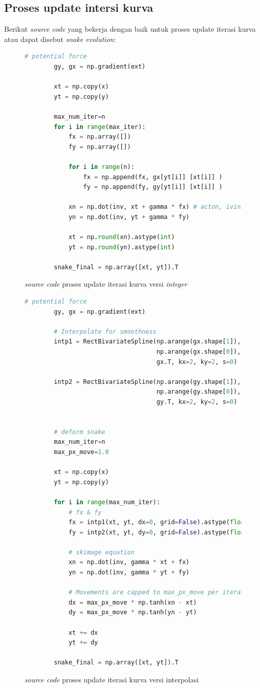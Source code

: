 \subsection{Proses update intersi kurva}
Berikut \emph{source code} yang bekerja dengan baik untuk proses update iterasi kurva atau dapat disebut \emph{snake evolution}:
\begin{figure}[H]
	\begin{lstlisting}[language=Python, basicstyle=\tiny]
		# potential force
		gy, gx = np.gradient(ext)
		
		xt = np.copy(x)
		yt = np.copy(y)
		
		max_num_iter=n
		for i in range(max_iter):
			fx = np.array([])
			fy = np.array([])
			
			for i in range(n):
				fx = np.append(fx, gx[yt[i]] [xt[i]] )
				fy = np.append(fy, gy[yt[i]] [xt[i]] )
			
			xn = np.dot(inv, xt + gamma * fx) # acton, ivins equation
			yn = np.dot(inv, yt + gamma * fy)
			
			xt = np.round(xn).astype(int)
			yt = np.round(yn).astype(int)
		
		snake_final = np.array([xt, yt]).T
	\end{lstlisting}
	\caption{\emph{source code} proses update iterasi kurva versi \emph{integer}}
	\label{code:snake_evol_int}
\end{figure}
\begin{figure}[H]
	\begin{lstlisting}[language=Python, basicstyle=\tiny]
		# potential force
		gy, gx = np.gradient(ext)
		
		# Interpolate for smoothness
		intp1 = RectBivariateSpline(np.arange(gx.shape[1]),
									np.arange(gx.shape[0]),
									gx.T, kx=2, ky=2, s=0)
		
		intp2 = RectBivariateSpline(np.arange(gy.shape[1]),
									np.arange(gy.shape[0]),
									gy.T, kx=2, ky=2, s=0)
		
		
		# deform snake
		max_num_iter=n
		max_px_move=1.0
		
		xt = np.copy(x)
		yt = np.copy(y)
		
		for i in range(max_num_iter):
			# fx & fy
			fx = intp1(xt, yt, dx=0, grid=False).astype(float, copy=False)
			fy = intp2(xt, yt, dy=0, grid=False).astype(float, copy=False)
		
			# skimage equation
			xn = np.dot(inv, gamma * xt + fx)
			yn = np.dot(inv, gamma * yt + fy)
		
			# Movements are capped to max_px_move per iteration. skimage
			dx = max_px_move * np.tanh(xn - xt)
			dy = max_px_move * np.tanh(yn - yt)
		
			xt += dx
			yt += dy
		
		snake_final = np.array([xt, yt]).T
	\end{lstlisting}
	\caption{\emph{source code} proses update iterasi kurva versi interpolasi}
	\label{code:snake_evol_float}
\end{figure}
